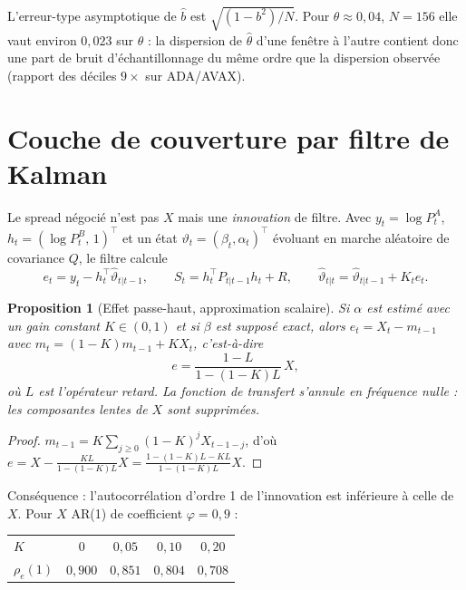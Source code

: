 \documentclass[11pt,a4paper]{article}
\newtheorem{proposition}{Proposition}
\theoremstyle{definition}
\theoremstyle{remark}
\begin{document}
L'erreur-type asymptotique de $\hat b$ est $\sqrt{(1-b^2)/N}$. Pour $\theta\approx0{,}04$, $N=156$ elle vaut environ $0{,}023$ sur $\theta$ :
la dispersion de $\hat\theta$ d'une fenêtre à l'autre contient donc une part de bruit d'échantillonnage du même ordre que la dispersion observée
(rapport des déciles $9\times$ sur ADA/AVAX).

\section{Couche de couverture par filtre de Kalman}\label{sec:kalman}

Le spread négocié n'est pas $X$ mais une \emph{innovation} de filtre. Avec $y_t=\log P^A_t$, $h_t=(\log P^B_t,\,1)^\top$ et un état
$\vartheta_t=(\beta_t,\alpha_t)^\top$ évoluant en marche aléatoire de covariance $Q$, le filtre calcule
\[
e_t=y_t-h_t^\top\hat\vartheta_{t|t-1},\qquad S_t=h_t^\top P_{t|t-1}h_t+R,\qquad
\hat\vartheta_{t|t}=\hat\vartheta_{t|t-1}+K_t e_t .
\]

\begin{proposition}[Effet passe-haut, approximation scalaire]
Si $\alpha$ est estimé avec un gain constant $K\in(0,1)$ et si $\beta$ est supposé exact, alors $e_t=X_t-m_{t-1}$ avec
$m_t=(1-K)m_{t-1}+KX_t$, c'est-à-dire
\[
e=\frac{1-L}{1-(1-K)L}\,X ,
\]
où $L$ est l'opérateur retard. La fonction de transfert s'annule en fréquence nulle : les composantes lentes de $X$ sont supprimées.
\end{proposition}
\begin{proof}
$m_{t-1}=K\sum_{j\ge0}(1-K)^jX_{t-1-j}$, d'où $e=X-\frac{KL}{1-(1-K)L}X=\frac{1-(1-K)L-KL}{1-(1-K)L}X$.
\end{proof}

Conséquence : l'autocorrélation d'ordre 1 de l'innovation est inférieure à celle de $X$. Pour $X$ AR(1) de coefficient $\varphi=0{,}9$ :

\begin{center}
\begin{tabular}{lcccc}
\toprule
$K$ & $0$ & $0{,}05$ & $0{,}10$ & $0{,}20$\\
$\rho_e(1)$ & $0{,}900$ & $0{,}851$ & $0{,}804$ & $0{,}708$\\
\bottomrule
\end{tabular}
\end{center}
\end{document}
